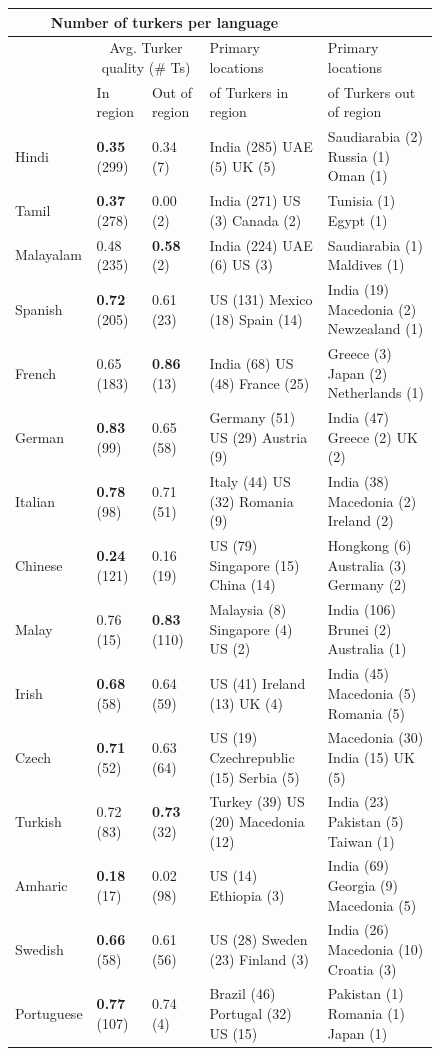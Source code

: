\documentclass[11pt]{article}
\begin{document}
\footnotesize
\begin{figure}
\begin{tabular}{lllll}
\multicolumn{4}{c}{Number of turkers per language}\\
\hline\hline
&\multicolumn{2}{c}{Avg. Turker quality (\# Ts)}&Primary locations&Primary locations\\
&In region&Out of region&of Turkers in region&of Turkers out of region\\
\hline\hline
Hindi&\textbf{0.35} (299)&0.34 (7)&India (285) UAE (5) UK (5) &Saudiarabia (2) Russia (1) Oman (1) \\
Tamil&\textbf{0.37} (278)&0.00 (2)&India (271) US (3) Canada (2) &Tunisia (1) Egypt (1) \\
Malayalam&0.48 (235) &\textbf{0.58} (2)&India (224) UAE (6) US (3) &Saudiarabia (1) Maldives (1) \\
Spanish&\textbf{0.72} (205)&0.61 (23)&US (131) Mexico (18) Spain (14) &India (19) Macedonia (2) Newzealand (1) \\
French&0.65 (183) &\textbf{0.86} (13)&India (68) US (48) France (25) &Greece (3) Japan (2) Netherlands (1) \\
German&\textbf{0.83} (99)&0.65 (58)&Germany (51) US (29) Austria (9) &India (47) Greece (2) UK (2) \\
Italian&\textbf{0.78} (98)&0.71 (51)&Italy (44) US (32) Romania (9) &India (38) Macedonia (2) Ireland (2) \\
Chinese&\textbf{0.24} (121)&0.16 (19)&US (79) Singapore (15) China (14) &Hongkong (6) Australia (3) Germany (2) \\
Malay&0.76 (15) &\textbf{0.83} (110)&Malaysia (8) Singapore (4) US (2) &India (106) Brunei (2) Australia (1) \\
Irish&\textbf{0.68} (58)&0.64 (59)&US (41) Ireland (13) UK (4) &India (45) Macedonia (5) Romania (5) \\
Czech&\textbf{0.71} (52)&0.63 (64)&US (19) Czechrepublic (15) Serbia (5) &Macedonia (30) India (15) UK (5) \\
Turkish&0.72 (83) &\textbf{0.73} (32)&Turkey (39) US (20) Macedonia (12) &India (23) Pakistan (5) Taiwan (1) \\
Amharic&\textbf{0.18} (17)&0.02 (98)&US (14) Ethiopia (3) &India (69) Georgia (9) Macedonia (5) \\
Swedish&\textbf{0.66} (58)&0.61 (56)&US (28) Sweden (23) Finland (3) &India (26) Macedonia (10) Croatia (3) \\
Portuguese&\textbf{0.77} (107)&0.74 (4)&Brazil (46) Portugal (32) US (15) &Pakistan (1) Romania (1) Japan (1) \\

\end{tabular}
\end{figure}
\end{document}
